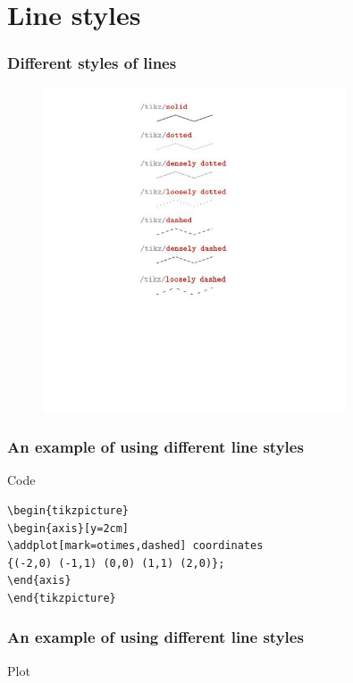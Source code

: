 \documentclass{beamer}
\begin{document}
\section{Line styles}
\begin{frame}[fragile]
\frametitle{Different styles of lines}
\begin{figure}
\centering
\includegraphics[width=0.8\textwidth]{fig3.jpg}
\end{figure}
\end{frame}
\begin{frame}[fragile]
\frametitle{An example of using different line styles}
\begin{block}{Code}
\begin{verbatim}
\begin{tikzpicture}
\begin{axis}[y=2cm]
\addplot[mark=otimes,dashed] coordinates
{(-2,0) (-1,1) (0,0) (1,1) (2,0)};
\end{axis}
\end{tikzpicture}
\end{verbatim}
\end{block}
\end{frame}
\begin{frame}[fragile]
\frametitle{An example of using different line styles}
\begin{block}{Plot}
\end{block}
\end{frame}
\end{document}
